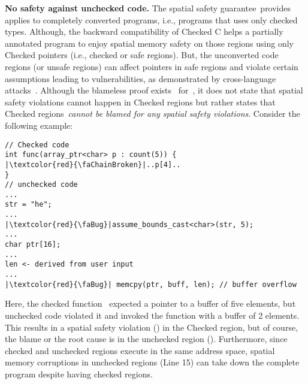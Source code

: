 \noindent
\textbf{No safety against unchecked code.} The spatial safety guarantee~\checkedc provides applies to completely converted programs, i.e., programs that uses only checked types.
Although, the backward compatibility of Checked C helps a partially annotated program to enjoy spatial memory safety on those regions using only Checked pointers (i.e., checked or safe regions).
But, the unconverted code regions (or unsafe regions) can affect pointers in safe regions and violate certain assumptions leading to vulnerabilities, as demonstrated by cross-language attacks~\cite{mergendahlcross}.
Although the blameless proof exists~\cite{ruef2019achieving} for~\checkedc, it does not state that spatial safety violations cannot happen in Checked regions but rather states that Checked regions~\emph{cannot be blamed for any spatial safety violations}.
Consider the following example:
\begin{verbatim}
// Checked code
int func(array_ptr<char> p : count(5)) {
|\textcolor{red}{\faChainBroken}|..p[4]..
}
// unchecked code
...
str = "he";
...
|\textcolor{red}{\faBug}|assume_bounds_cast<char>(str, 5); 
...
char ptr[16];
...
len <- derived from user input
...
|\textcolor{red}{\faBug}| memcpy(ptr, buff, len); // buffer overflow
\end{verbatim}
Here, the checked function~ expected a pointer to a buffer of five elements, but unchecked code violated it and invoked the function with a buffer of 2 elements.
This results in a spatial safety violation (\textcolor{red}{\faChainBroken}) in the Checked region, but of course, the blame or the root cause is in the unchecked region (\textcolor{red}{\faBug}).
Furthermore, since checked and unchecked regions execute in the same address space, spatial memory corruptions in unchecked regions (Line 15) can take down the complete program despite having checked regions.
